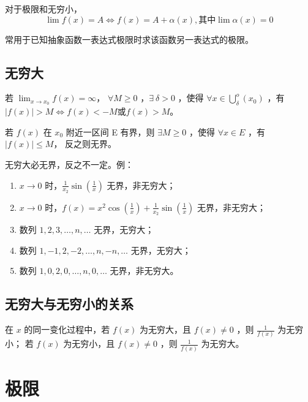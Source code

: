 对于极限和无穷小，
$$
    \lim f(x)=A\Leftrightarrow f(x)=A+\alpha(x), \textrm{其中}\lim \alpha(x)=0
$$ 

常用于已知抽象函数一表达式极限时求该函数另一表达式的极限。

\subsection{无穷大}

\begin{Def}[无穷大的定义]

    若 $ \displaystyle\lim_{x\rightarrow x_0}f(x)=\infty $， $ \forall M\geq 0 $ ，$ \exists\ \delta>0 $ ，使得
    $ \forall x\in \displaystyle\bigcup^o_{\delta}(x_0) $ ，有 $ |f(x)|>M\Leftrightarrow f(x) < -M \textrm{或} f(x) > M $。    
\end{Def}

\begin{Def}[有界和无界的定义]

    若 $ f(x) $ 在 $ x_0 $ 附近一区间 E 有界，则 $ \exists M\geq0 $ ，使得 $ \forall x \in E $ ，有 $ |f(x)|\leq M $，
    反之则无界。
\end{Def}

无穷大必无界，反之不一定。例：
\begin{enumerate}
    \item $ x\rightarrow0 $ 时，$ \frac{1}{x_2}\sin(\frac{1}{x}) $ 无界，非无穷大；
    \item $ x\rightarrow0 $ 时，$ f(x)=x^2\cos(\frac{1}{x})+\frac{1}{x_2}\sin(\frac{1}{x}) $ 无界，非无穷大；
    \item 数列 $ 1,2,3,\dots,n,\dots $ 无界，无穷大；
    \item 数列 $ 1,-1,2,-2,\dots,n,-n,\dots $ 无界，无穷大；
    \item 数列 $ 1,0,2,0,\dots,n,0,\dots $ 无界，非无穷大。
\end{enumerate}

\subsection{无穷大与无穷小的关系}

在 $ x $ 的同一变化过程中，若 $ f(x) $ 为无穷大，且 $ f(x)\neq 0 $ ，则 $ \frac{1}{f(x)} $ 为无穷小；
若 $ f(x) $ 为无穷小，且 $ f(x)\neq 0 $ ，则 $ \frac{1}{f(x)} $ 为无穷大。

\section{极限}

